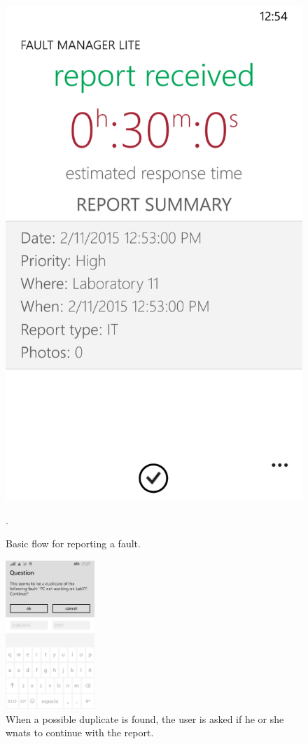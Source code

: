 \documentclass{report}
\begin{document}
\begin{figure}[hbtp]
\begin{minipage}{0.3\textwidth}
\includegraphics[width=\textwidth]{img/ReportReceived.png}
\end{minipage}
\caption{Basic flow for reporting a fault.}
\label{imgReportFlow}.
\end{figure}

\begin{figure}[hbtp]
\centering
\includegraphics[width=0.3\textwidth]{img/DuplicateMessage.jpg}
\caption{When a possible duplicate is found, the user is asked if he or she wnats to continue with the report.}
\label{imgDuplicateReport}
\end{figure}
\end{document}

